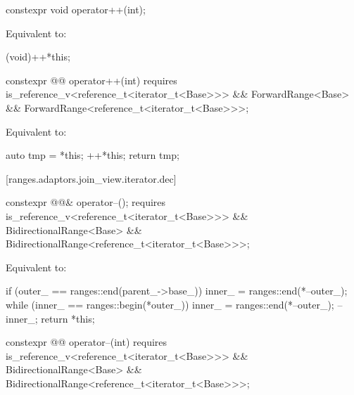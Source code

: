 \begin{itemdecl}
constexpr void operator++(int);
\end{itemdecl}

\begin{itemdescr}
\pnum
\effects Equivalent to:
\begin{codeblock}
(void)++*this;
\end{codeblock}
\end{itemdescr}

\begin{itemdecl}
constexpr @@ operator++(int)
  requires is_reference_v<reference_t<iterator_t<Base>>> &&
      ForwardRange<Base> &&
      ForwardRange<reference_t<iterator_t<Base>>>;
\end{itemdecl}

\begin{itemdescr}
\pnum
\effects Equivalent to:
\begin{codeblock}
auto tmp = *this;
++*this;
return tmp;
\end{codeblock}
\end{itemdescr}

[ranges.adaptors.join_view.iterator.dec]{}

\begin{itemdecl}
constexpr @@& operator--();
  requires is_reference_v<reference_t<iterator_t<Base>>> &&
      BidirectionalRange<Base> &&
      BidirectionalRange<reference_t<iterator_t<Base>>>;
\end{itemdecl}

\begin{itemdescr}
\pnum
\effects Equivalent to:
\begin{codeblock}
if (outer_ == ranges::end(parent_->base_))
  inner_ = ranges::end(*--outer_);
while (inner_ == ranges::begin(*outer_))
  inner_ = ranges::end(*--outer_);
--inner_;
return *this;
\end{codeblock}
\end{itemdescr}

\begin{itemdecl}
constexpr @@ operator--(int)
  requires is_reference_v<reference_t<iterator_t<Base>>> &&
      BidirectionalRange<Base> &&
      BidirectionalRange<reference_t<iterator_t<Base>>>;
\end{itemdecl}


